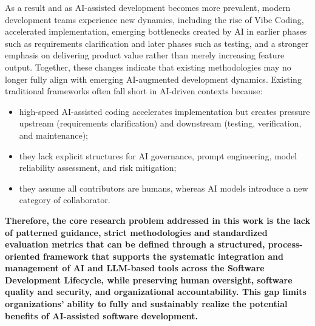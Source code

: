 As a result and as AI-assisted development becomes more prevalent, modern development teams experience new dynamics, including the rise of Vibe Coding, accelerated implementation, emerging bottlenecks created by AI in earlier phases such as requirements clarification and later phases such as testing, and a stronger emphasis on delivering product value rather than merely increasing feature output. Together, these changes indicate that existing methodologies may no longer fully align with emerging AI-augmented development dynamics. Existing traditional frameworks often fall short in AI-driven contexts because:

\begin{itemize}
    \item high-speed AI-assisted coding accelerates implementation but creates pressure upstream (requirements clarification) and downstream (testing, verification, and maintenance);
    \item they lack explicit structures for AI governance, prompt engineering, model reliability assessment, and risk mitigation;
    \item they assume all contributors are humans, whereas AI models introduce a new category of collaborator.
\end{itemize}

\textbf{Therefore, the core research problem addressed in this work is the lack of patterned guidance, strict methodologies and standardized evaluation metrics that can be defined through a structured, process-oriented framework that supports the systematic integration and management of AI and LLM-based tools across the Software Development Lifecycle, while preserving human oversight, software quality and security, and organizational accountability. This gap limits organizations’ ability to fully and sustainably realize the potential benefits of AI-assisted software development.}

